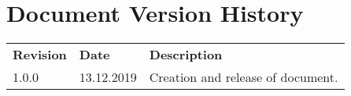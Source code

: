\chapter*{Document Version History}
\label{ch:versionhistory}
\begin{table}[h]
\begin{tabular}{lll}
\textbf{Revision} & \textbf{Date} & \textbf{Description}              \\
1.0.0             & 13.12.2019    & Creation and release of document.                                                                     
\end{tabular}
\end{table}